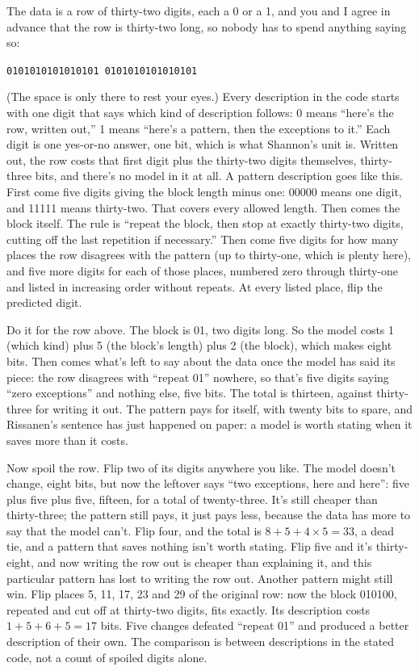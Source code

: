 \documentclass[11pt,twoside]{article}
\theoremstyle{thielethm}
\theoremstyle{thieledef}
\theoremstyle{thieledef}
\theoremstyle{thieledef}
\theoremstyle{thielethm}
\theoremstyle{thieleobs}
\theoremstyle{thielethm}
\begin{document}
The data is a row of thirty-two digits, each a 0 or a 1, and you and I agree in advance that the row is thirty-two long, so nobody has to spend anything saying so:

\begin{center}\texttt{0101010101010101 0101010101010101}\end{center}

(The space is only there to rest your eyes.) Every description in the code starts with one digit that says which kind of description follows: 0 means ``here's the row, written out,'' 1 means ``here's a pattern, then the exceptions to it.'' Each digit is one yes-or-no answer, one bit, which is what Shannon's unit is. Written out, the row costs that first digit plus the thirty-two digits themselves, thirty- three bits, and there's no model in it at all. A pattern description goes like this. First come five digits giving the block length minus one: 00000 means one digit, and 11111 means thirty-two. That covers every allowed length. Then comes the block itself. The rule is ``repeat the block, then stop at exactly thirty-two digits, cutting off the last repetition if necessary.'' Then come five digits for how many places the row disagrees with the pattern (up to thirty-one, which is plenty here), and five more digits for each of those places, numbered zero through thirty-one and listed in increasing order without repeats. At every listed place, flip the predicted digit.

Do it for the row above. The block is 01, two digits long. So the model costs 1 (which kind) plus 5 (the block's length) plus 2 (the block), which makes eight bits. Then comes what's left to say about the data once the model has said its piece: the row disagrees with ``repeat 01'' nowhere, so that's five digits saying ``zero exceptions'' and nothing else, five bits. The total is thirteen, against thirty-three for writing it out. The pattern pays for itself, with twenty bits to spare, and Rissanen's sentence has just happened on paper: a model is worth stating when it saves more than it costs.

Now spoil the row. Flip two of its digits anywhere you like. The model doesn't change, eight bits, but now the leftover says ``two exceptions, here and here'': five plus five plus five, fifteen, for a total of twenty-three. It's still cheaper than thirty-three; the pattern still pays, it just pays less, because the data has more to say that the model can't. Flip four, and the total is $8 + 5 + 4 \times 5 = 33$, a dead tie, and a pattern that saves nothing isn't worth stating. Flip five and it's thirty-eight, and now writing the row out is cheaper than explaining it, and this particular pattern has lost to writing the row out. Another pattern might still win. Flip places 5, 11, 17, 23 and 29 of the original row: now the block 010100, repeated and cut off at thirty-two digits, fits exactly. Its description costs $1+5+6+5=17$ bits. Five changes defeated ``repeat 01'' and produced a better description of their own. The comparison is between descriptions in the stated code, not a count of spoiled digits alone.
\end{document}
